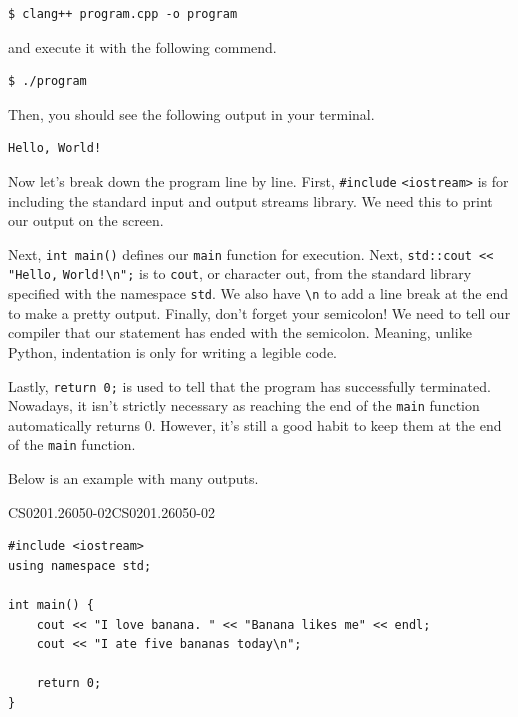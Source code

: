 \documentclass[../../main.tex]{subfiles}
\begin{document}
\begin{basicbox}
\begin{lstlisting}[style=basic]
$ clang++ program.cpp -o program
\end{lstlisting}
\end{basicbox}

and execute it with the following commend.

\begin{basicbox}
\begin{lstlisting}[style=basic]
$ ./program
\end{lstlisting}
\end{basicbox}

Then, you should see the following output in your terminal.

\begin{outputbox}
\begin{lstlisting}[style=basic]
Hello, World!
\end{lstlisting}
\end{outputbox}

Now let's break down the program line by line. First, \verb|#include|
\newline \verb|<iostream>| is for including the standard input and
output streams library. We need this to print our output on the
screen.

Next, \verb|int main()| defines our \verb|main| function for
execution. Next, \verb|std::cout << "Hello,| \verb|World!\n";| is to
\verb|cout|, or character out, from the standard library specified
with the namespace \verb|std|. We also have \verb|\n| to add a line
break at the end to make a pretty output. Finally, don't forget your
semicolon! We need to tell our compiler that our statement has ended
with the semicolon. Meaning, unlike Python, indentation is only for
writing a legible code.

Lastly, \verb|return 0;| is used to tell that the program has
successfully terminated. Nowadays, it isn't strictly necessary as
reaching the end of the \verb|main| function automatically returns
$0$. However, it's still a good habit to keep them at the end of the
\verb|main| function.

Below is an example with many outputs.

\begin{cppbox}{CS0201.26050-02}{CS0201.26050-02}
\begin{lstlisting}[style=cppstyle]
#include <iostream>
using namespace std;

int main() {
    cout << "I love banana. " << "Banana likes me" << endl;
    cout << "I ate five bananas today\n";

    return 0;
}
\end{lstlisting}
\end{cppbox}
\end{document}
